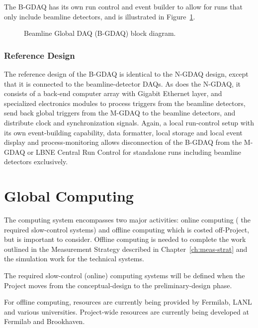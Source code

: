 The B-GDAQ has its own run control and event builder to allow for runs that 
only include beamline detectors, and is illustrated in Figure~\ref{fig:GDAQ_B_Block}.

\begin{figure}[htp]
\begin{center}
\caption{\label{fig:GDAQ_B_Block} Beamline Global DAQ (B-GDAQ) block 
diagram.  %
}
\end{center}
\end{figure}


\subsubsection{Reference Design}

The reference design of the B-GDAQ is %
identical to the 
N-GDAQ design, except that it is connected to the beamline-detector DAQs. 
As does the N-GDAQ, it 
consists of a back-end computer array with Gigabit Ethernet layer, 
and specialized electronics modules to process triggers from the 
beamline detectors, send back global triggers from the %
M-GDAQ  %
to the 
beamline detectors, and distribute clock and synchronization signals. 
Again, a local run-control setup with its own event-building capability, 
data formatter, local storage and local event display and process-monitoring 
allows disconnection of the B-GDAQ from the %
M-GDAQ  %
or LBNE 
Central Run Control for standalone runs including beamline 
detectors exclusively.


\section{Global Computing}
The computing system encompasses two major activities: %
online computing (%
the required slow-control systems) and %
offline 
computing which is costed off-Project, but is important to consider.
Offline computing is needed to complete 
the work outlined in the Measurement Strategy described in Chapter~\ref{ch:meas-strat} and the simulation work %
for the technical systems.

The required slow-control (online) computing systems will be defined when the Project moves 
from the conceptual-design to the preliminary-design phase.

For offline computing, resources are currently being provided by Fermilab, 
LANL and various universities.  Project-wide resources are currently 
being developed at Fermilab and Brookhaven.
